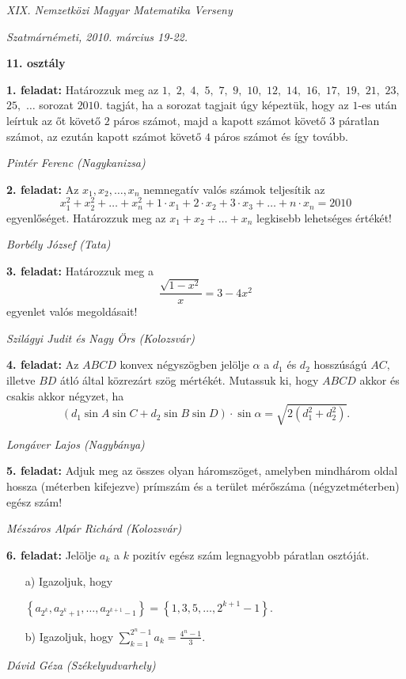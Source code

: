 \documentclass[a4paper,10pt]{article}
\def\ki#1#2{\hfill {\it #1 (#2)}\medskip}
\begin{document}
\begin{center} \Large {\em XIX. Nemzetközi Magyar Matematika Verseny} \end{center}
\begin{center} \large{\em Szatmárnémeti, 2010. március 19-22.} \end{center}
\smallskip
\begin{center} \large{\bf 11. osztály} \end{center}
\bigskip 

{\bf 1. feladat: } Határozzuk meg az $1,$ $2,$ $4,$ $5,$ $7,$ $9,$ $10,$ $12,$ $14,$
$16,$ $17,$ $19,$ $21,$ $23,$ $25,$ $\ldots$ sorozat $2010.$ tagját,
ha a sorozat tagjait úgy képeztük, hogy az $1$-es után leírtuk az őt
követő $2$ páros számot, majd a kapott számot követő $3$ páratlan
számot, az ezután kapott számot követő $4$ páros számot és így
tovább.

\ki{Pintér Ferenc}{Nagykanizsa}\medskip

{\bf 2. feladat: } Az $x_1,x_2,\ldots, x_n$ nemnegatív valós számok teljesítik
az $$x_1^2+x_2^2+\ldots +x_n^2 + 1\cdot x_1+2\cdot x_2+3\cdot
x_3+\ldots +n\cdot x_n=2010$$ egyenlőséget. Határozzuk meg az
$x_1+x_2+\ldots +x_n$ legkisebb lehetséges értékét!

\ki{Borbély József}{Tata}\medskip

{\bf 3. feladat: } Határozzuk meg a
$$\frac{\sqrt{1-x^2}}{x}=3-4x^2$$ egyenlet valós megoldásait!

\ki{Szilágyi Judit és Nagy Örs}{Kolozsvár}\medskip

{\bf 4. feladat: } Az $ABCD$ konvex négyszögben jelölje $\alpha$ a $d_1$ és $d_2$
hosszúságú $AC,$ illetve $BD$ átló által közrezárt szög
mértékét. Mutassuk ki, hogy $ABCD$ akkor és csakis akkor
négyzet, ha
$$(d_1\sin{A}\sin{C}+d_2\sin{B}\sin{D})\cdot\sin{\alpha}=
\sqrt{2(d_1^2+d_2^2)}.$$

\ki{Longáver Lajos}{Nagybánya}\medskip

{\bf 5. feladat: } Adjuk meg az összes olyan háromszöget, amelyben mindhárom
oldal hossza (méterben kifejezve) prímszám és a
terület mérőszáma (négyzet\-méterben) egész szám!

\ki{Mészáros Alpár Richárd}{Kolozsvár}\medskip

{\bf 6. feladat: } Jelölje $a_k$ a $k$ pozitív egész szám legnagyobb páratlan osztóját.
\begin{itemize}
\item[a)] Igazoljuk, hogy

\centerline{ $\displaystyle \left\{ {a_{2^k } ,a_{2^k  + 1}
,\ldots,a_{2^{k + 1} - 1} } \right\} = \left\{ {1,3,5,\ldots,2^{k +
1} - 1} \right\}.$}

\item[b)] Igazoljuk, hogy $\displaystyle \sum\limits_{k = 1}^{2^n  - 1} {a_k }  =
\frac{{4^n  - 1}}{3}.$
\end{itemize}

\ki{Dávid Géza}{Székelyudvarhely}\medskip

\vfill
\end{document}

